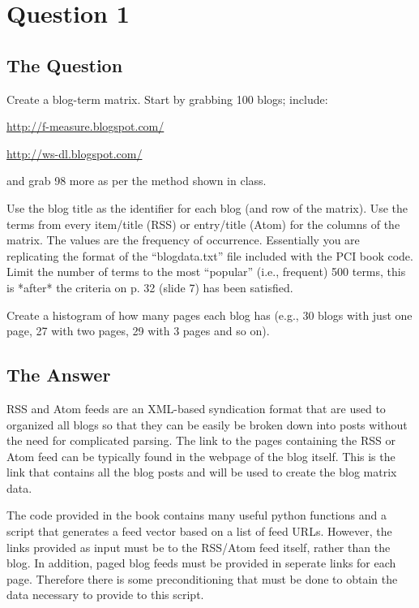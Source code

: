 \section{Question 1}

\subsection{The Question}

\begin{flushleft}

Create a blog-term matrix.  Start by grabbing 100 blogs; include:

\vspace{10pt}
\url{http://f-measure.blogspot.com/}

\url{http://ws-dl.blogspot.com/}

\vspace{10pt}
and grab 98 more as per the method shown in class.

Use the blog title as the identifier for each blog (and row of the
matrix).  Use the terms from every item/title (RSS) or entry/title
(Atom) for the columns of the matrix.  The values are the frequency
of occurrence.  Essentially you are replicating the format of the
``blogdata.txt'' file included with the PCI book code.  Limit the
number of terms to the most ``popular'' (i.e., frequent) 500 terms,
this is *after* the criteria on p. 32 (slide 7) has been satisfied.

Create a histogram of how many pages each blog has (e.g., 30
blogs with just one page, 27 with two pages, 29 with 3 pages and 
so on).

\end{flushleft}


\subsection{The Answer}



RSS and Atom feeds are an XML-based syndication format that are used to organized all blogs so that they can be easily be broken down into posts without the need for complicated parsing. The link to the pages containing the RSS or Atom feed can be typically found in the webpage of the blog itself. This is the link that contains all the blog posts and will be used to create the blog matrix data. 

The code provided in the book \cite{PCI} contains many useful python functions and a script that generates a feed vector based on a list of feed URLs. However, the links provided as input must be to the RSS/Atom feed itself, rather than the blog. In addition, paged blog feeds must be provided in seperate links for each page. Therefore there is some preconditioning that must be done to obtain the data necessary to provide to this script. 

